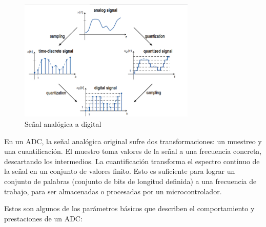 \documentclass[12pt]{report} %
\begin{document}
	\begin{figure}[H]
		\includegraphics[width=0.75\textwidth]{analog-vs-digital-signal.jpg}
		\caption[Señal analógica a digital]{Señal analógica a digital\protect\footnotemark}
		\label{fig:analog-vs-digital-signal.jpg}
	\end{figure}
	
	En un ADC, la señal analógica original sufre dos transformaciones: un muestreo y una cuantificación. El muestro toma valores de la señal a una frecuencia concreta, descartando los intermedios. La cuantificación transforma el espectro continuo de la señal en un conjunto de valores finito. Esto es suficiente para lograr un conjunto de palabras (conjunto de bits de longitud definida) a una frecuencia de trabajo, para ser almacenadas o procesadas por un microcontrolador.
	
	Estos son algunos de los parámetros básicos que describen el comportamiento y prestaciones de un ADC:
	
\end{document}
